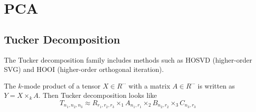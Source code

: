 \section{PCA}

\subsection{Tucker Decomposition}

The Tucker decomposition family includes methods such as HOSVD (higher-order 
SVG) and HOOI (higher-order orthogonal iteration).

The $k$-mode product of a tensor $X\in R^{\cdots}$ with a matrix $A\in
R^{\cdots}$ is written as $Y=X\times_k A$. Then Tucker decomposition looks
like
$$
T_{n_1,n_2,n_3} \approx R_{r_1,r_2,r_3}
\times_1 A_{n_1,r_1} \times_2 B_{n_2,r_2} \times_3 C_{n_3,r_3}
$$
